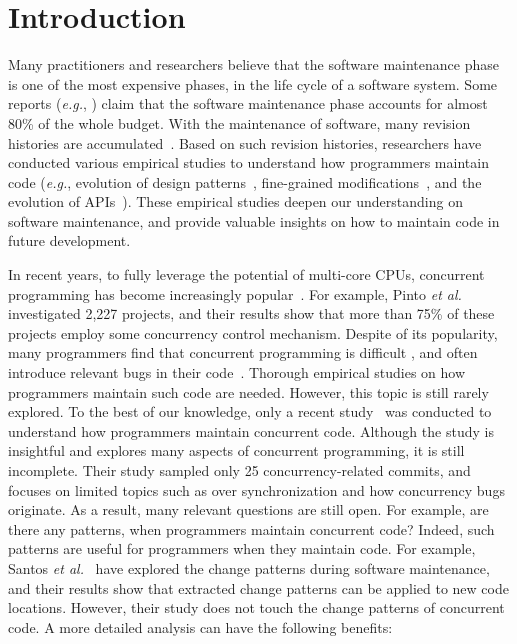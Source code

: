 \section{Introduction}
\label{sec:intro}
Many practitioners and researchers believe that the software maintenance phase is one of the most expensive phases, in the life cycle of a software system. Some reports (\emph{e.g.}, \cite{ahn2003software}) claim that the software maintenance phase accounts for almost 80\% of the whole budget. With the maintenance of software, many revision histories are accumulated~\cite{conf/icsm/Borges16}. Based on such revision histories, researchers have conducted various empirical studies to understand how programmers maintain code (\emph{e.g.}, evolution of design patterns~\cite{aversano2007empirical}, fine-grained modifications~\cite{german2006empirical}, and the evolution of APIs~\cite{mcdonnell2013empirical}). These empirical studies deepen our understanding on software maintenance, and provide valuable insights on how to maintain code in future development.

In recent years, to fully leverage the potential of multi-core CPUs, concurrent programming has become increasingly popular~\cite{journals/jss/PintoTFFB15}. For example, Pinto \emph{et al.}~\cite{journals/jss/PintoTFFB15} investigated 2,227 projects, and their results show that more than 75\% of these projects employ some concurrency control mechanism. Despite of its popularity, many programmers find that concurrent programming is difficult \cite{journals/corr/McKenney17}, and often introduce relevant bugs in their code~\cite{conf/asplos/LuPSZ08}. Thorough empirical studies on how programmers maintain such code are needed. However, this topic is still rarely explored. To the best of our knowledge, only a recent study~\cite{conf/sigsoft/GuJSZL15} was conducted to understand how programmers maintain concurrent code. Although the study is insightful and explores many aspects of concurrent programming, it is still incomplete. Their study sampled only 25 concurrency-related commits, and focuses on limited topics such as over synchronization and how concurrency bugs originate. As a result, many relevant questions are still open. For example, are there any patterns, when programmers maintain concurrent code? Indeed, such patterns are useful for programmers when they maintain code. For example, Santos \emph{et al.}~\cite{conf/icsm/SantosAEDV15} have explored the change patterns during software maintenance, and their results show that extracted change patterns can be applied to new code locations. However, their study does not touch the change patterns of concurrent code. A more detailed analysis can have the following benefits:



